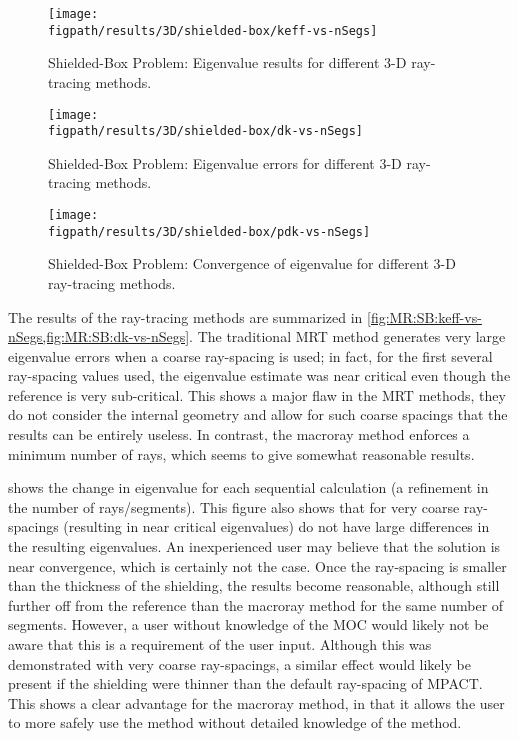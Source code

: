 {{{      \begin{figure}[hp]
        \centering
        \texttt{[image: \\figpath/results/3D/shielded-box/keff-vs-nSegs]}
        \caption{Shielded-Box Problem: Eigenvalue results for different 3-D ray-tracing methods. \label{fig:MR:SB:keff-vs-nSegs}}
      \end{figure}
      \begin{figure}[hp]
        \centering
        \texttt{[image: \\figpath/results/3D/shielded-box/dk-vs-nSegs]}
        \caption{Shielded-Box Problem: Eigenvalue errors for different 3-D ray-tracing methods. \label{fig:MR:SB:dk-vs-nSegs}}
      \end{figure}
      \begin{figure}[hp]
        \centering
        \texttt{[image: \\figpath/results/3D/shielded-box/pdk-vs-nSegs]}
        \caption{Shielded-Box Problem: Convergence of eigenvalue for different 3-D ray-tracing methods. \label{fig:MR:SB:pdk-vs-nSegs}}
      \end{figure}

      The results of the ray-tracing methods are summarized in \cref{fig:MR:SB:keff-vs-nSegs,fig:MR:SB:dk-vs-nSegs}.
      The traditional \ac{MRT} method generates very large eigenvalue errors when a coarse ray-spacing is used;
        in fact, for the first several ray-spacing values used, the eigenvalue estimate was near critical even though the reference is very sub-critical.
      This shows a major flaw in the \ac{MRT} methods, they do not consider the internal geometry and allow for such coarse spacings that the results can be entirely useless.
      In contrast, the macroray method enforces a minimum number of rays, which seems to give somewhat reasonable results.

       shows the change in eigenvalue for each sequential calculation (a refinement in the number of rays/segments).
      This figure also shows that for very coarse ray-spacings (resulting in near critical eigenvalues) do not have large differences in the resulting eigenvalues.
      An inexperienced user may believe that the solution is near convergence, which is certainly not the case.
      Once the ray-spacing is smaller than the thickness of the shielding, the results become reasonable, although still further off from the reference than the macroray method for the same number of segments.
      However, a user without knowledge of the \ac{MOC} would likely not be aware that this is a requirement of the user input.
      Although this was demonstrated with very coarse ray-spacings, a similar effect would likely be present if the shielding were thinner than the default ray-spacing of MPACT.
      This shows a clear advantage for the macroray method, in that it allows the user to more safely use the method without detailed knowledge of the method.
    }

}}
